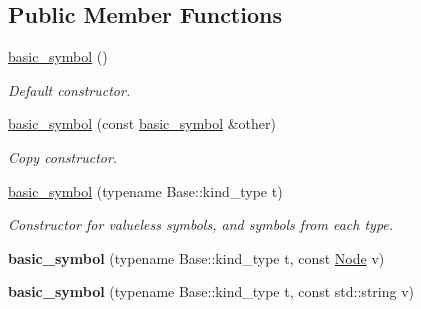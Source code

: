 \subsection*{Public Member Functions}
\begin{DoxyCompactItemize}
\item 
\hypertarget{structyy_1_1parser_1_1basic__symbol_a4c089d17ee545d109ca5660fbaa05b95}{}\hyperlink{structyy_1_1parser_1_1basic__symbol_a4c089d17ee545d109ca5660fbaa05b95}{basic\+\_\+symbol} ()\label{structyy_1_1parser_1_1basic__symbol_a4c089d17ee545d109ca5660fbaa05b95}

\begin{DoxyCompactList}\small\item\em Default constructor. \end{DoxyCompactList}\item 
\hypertarget{structyy_1_1parser_1_1basic__symbol_a840c58a9a75349d49586d6d0701dc0d9}{}\hyperlink{structyy_1_1parser_1_1basic__symbol_a840c58a9a75349d49586d6d0701dc0d9}{basic\+\_\+symbol} (const \hyperlink{structyy_1_1parser_1_1basic__symbol}{basic\+\_\+symbol} \&other)\label{structyy_1_1parser_1_1basic__symbol_a840c58a9a75349d49586d6d0701dc0d9}

\begin{DoxyCompactList}\small\item\em Copy constructor. \end{DoxyCompactList}\item 
\hypertarget{structyy_1_1parser_1_1basic__symbol_a20a558cd967a14b2645423110ed4f773}{}\hyperlink{structyy_1_1parser_1_1basic__symbol_a20a558cd967a14b2645423110ed4f773}{basic\+\_\+symbol} (typename Base\+::kind\+\_\+type t)\label{structyy_1_1parser_1_1basic__symbol_a20a558cd967a14b2645423110ed4f773}

\begin{DoxyCompactList}\small\item\em Constructor for valueless symbols, and symbols from each type. \end{DoxyCompactList}\item 
\hypertarget{structyy_1_1parser_1_1basic__symbol_ad26209c2437dbbeb48837d7f794b4e6b}{}{\bfseries basic\+\_\+symbol} (typename Base\+::kind\+\_\+type t, const \hyperlink{classNode}{Node} v)\label{structyy_1_1parser_1_1basic__symbol_ad26209c2437dbbeb48837d7f794b4e6b}

\item 
\hypertarget{structyy_1_1parser_1_1basic__symbol_a510aa97b0282c2b92180680798a882d3}{}{\bfseries basic\+\_\+symbol} (typename Base\+::kind\+\_\+type t, const std\+::string v)\label{structyy_1_1parser_1_1basic__symbol_a510aa97b0282c2b92180680798a882d3}


\end{DoxyCompactItemize}
